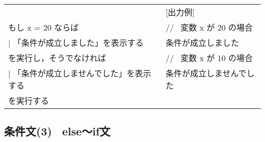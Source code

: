 \documentclass[11pt,a4j]{jarticle}
\begin{document}
\begin{table}[!h]
\hspace{1cm}
\begin{tabular}{l l}
\noindent [使用例] & \hspace{1zw} [出力例] \\
\hspace{1cm} \noindent もし x = 20 ならば & 
\hspace{1cm}  // \ 変数 x が 20 の場合 \\
\hspace{1cm}   \hspace{1zw} $|$ \hspace{1zw}  「条件が成立しました」を表示する &
\hspace{1cm} 条件が成立しました \\
\hspace{1cm} を実行し，そうでなければ &
\hspace{1cm} // \ 変数 x が 10 の場合 \\
\hspace{1cm}   \hspace{1zw} $|$ \hspace{1zw}  「条件が成立しませんでした」を表示する &
\hspace{1cm} 条件が成立しませんでした \\
\hspace{1cm} を実行する &
\hspace{2cm} \ \\
\end{tabular}
\end{table}

\vspace{-1.0cm}
\subsection{条件文(3) \ else〜if文}
\begin{quotation}
\end{quotation}
\end{document}

